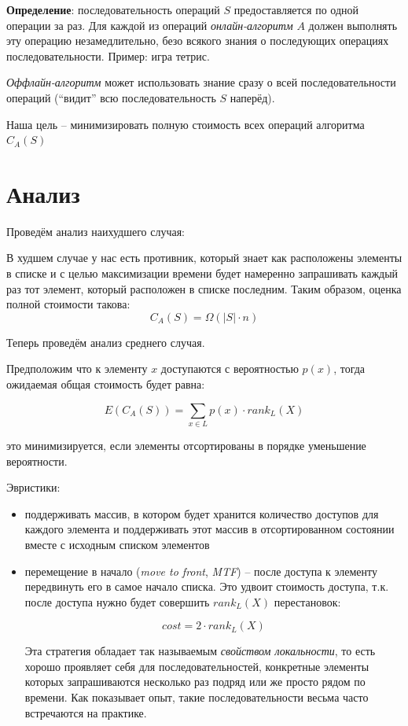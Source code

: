 \documentclass[a4paper,11pt]{article}
\begin{document}
\textbf{Определение}: последовательность операций $S$ предоставляется по одной
операции за раз. Для каждой из операций \emph{онлайн-алгоритм} $A$ должен
выполнять эту операцию незамедлительно, безо всякого знания о последующих
операциях последовательности. Пример: игра тетрис.

\emph{Оффлайн-алгоритм} может использовать знание сразу о всей
последовательности операций (``видит'' всю последовательность $S$ наперёд).

Наша цель -- минимизировать полную стоимость всех операций алгоритма $C_A(S)$

\section{Анализ}

Проведём анализ наихудшего случая:

В худшем случае у нас есть противник, который знает как расположены элементы в
списке и с целью максимизации времени будет намеренно запрашивать каждый раз тот
элемент, который расположен в списке последним. Таким образом, оценка полной
стоимости такова:
$$
C_A(S) = \Omega(|S| \cdot n)
$$

Теперь проведём анализ среднего случая.

Предположим что к элементу $x$ доступаются с вероятностью $p(x)$, тогда
ожидаемая общая стоимость будет равна:

$$
E(C_A(S)) = \sum_{x \in L} p(x) \cdot rank_L(X)
$$

это минимизируется, если элементы отсортированы в порядке уменьшение
вероятности.

Эвристики:
\begin{itemize}
\item поддерживать массив, в котором будет хранится количество доступов для
  каждого элемента и поддерживать этот массив в отсортированном состоянии вместе
  с исходным списком элементов
  
\item перемещение в начало (\emph{move to front}, \emph{MTF}) -- после доступа к
  элементу передвинуть его в самое начало списка. Это удвоит стоимость доступа,
  т.к. после доступа нужно будет совершить $rank_L(X)$ перестановок:
  
  $$
  cost = 2 \cdot rank_L(X)
  $$

  Эта стратегия обладает так называемым \emph{свойством локальности}, то есть
  хорошо проявляет себя для последовательностей, конкретные элементы которых
  запрашиваются несколько раз подряд или же просто рядом по времени. Как
  показывает опыт, такие последовательности весьма часто встречаются на
  практике.

\end{itemize}
\end{document}
